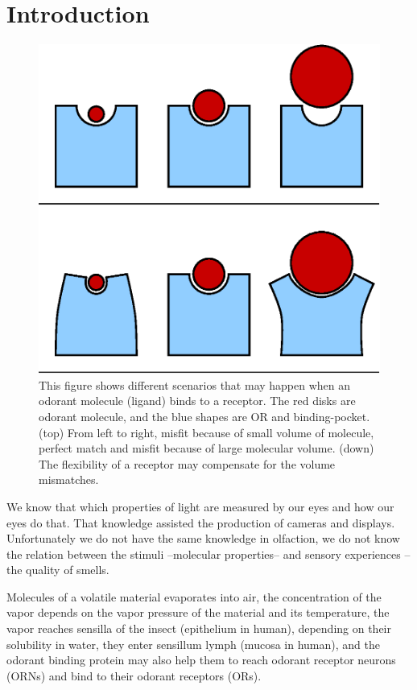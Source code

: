 \documentclass[11pt]{paper} %
\begin{document}
\section*{Introduction}
\begin{figure}
	\centering
	\includegraphics[width=0.4 \textwidth]{binding-pocket-size-flex}
	\caption{This figure shows different scenarios that may happen when an odorant molecule (ligand) binds to a receptor. 
		The red disks  are odorant molecule, 
		and the blue shapes are OR and binding-pocket.	
		(top) From left to right, misfit because of small volume of molecule, 
		perfect match and misfit because of large molecular volume.
		(down) The flexibility of a receptor may compensate for the volume mismatches.
		}
	\label{fig:binding-pocket}
\end{figure}


We know that which properties of light are measured by our eyes and how our eyes do that. 
That knowledge assisted the production of cameras and displays. 
Unfortunately we do not have the same knowledge in olfaction, 
we do not know the relation between the stimuli --molecular properties-- and sensory experiences --the quality of smells.  

Molecules of a volatile material evaporates into air, 
the concentration of the vapor depends on the vapor pressure of the material and its temperature, 
the vapor reaches sensilla of the insect (epithelium in human), 
depending on their solubility in water, they enter sensillum lymph (mucosa in human), 
and the odorant binding protein may also help them to reach odorant receptor neurons (ORNs) and bind to their odorant receptors (ORs). 
\end{document}
